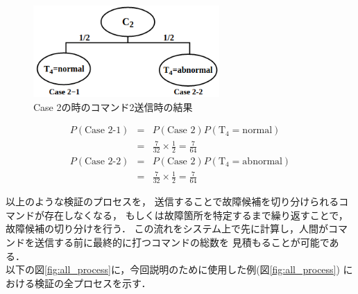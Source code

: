 \documentclass[11pt]{jsreport}
\begin{document}
\begin{figure}[H]
   \centering
      \includegraphics[height=3.5cm]{figure/TEL_result_process2.png}
      \caption{Case 2の時のコマンド2送信時の結果}
      \label{fig:TEL_result2}
\end{figure}
\vspace{-1zh}
\begin{eqnarray}
   P(\text{Case 2-1})  &=& P(\text{Case 2}) P(\text{T}_4=\text{normal}) \nonumber \\
     &=& \frac{7}{32} \times \frac{1}{2} = \frac{7}{64} \label{eq:T4=normal} \\
   P(\text{Case 2-2})  &=& P(\text{Case 2}) P(\text{T}_4=\text{abnormal}) \nonumber \\
     &=& \frac{7}{32} \times \frac{1}{2} = \frac{7}{64} \label{eq:T4=abnormal}
\end{eqnarray}

以上のような検証のプロセスを，
送信することで故障候補を切り分けられるコマンドが存在しなくなる，
もしくは故障箇所を特定するまで繰り返すことで，故障候補の切り分けを行う．
この流れをシステム上で先に計算し，人間がコマンドを送信する前に最終的に打つコマンドの総数を
見積もることが可能である．\\
以下の図\ref{fig:all_process}に，今回説明のために使用した例(図\ref{fig:all_process})
における検証の全プロセスを示す．
\end{document}
